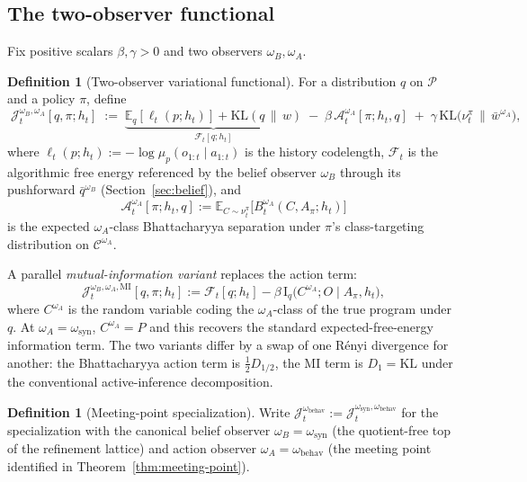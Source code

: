 \documentclass[11pt]{article}
\theoremstyle{definition}
\newtheorem{definition}[theorem]{Definition}
\theoremstyle{remark}
\newcommand{\Ccal}{\mathcal{C}}
\newcommand{\Pcal}{\mathcal{P}}
\newcommand{\E}{\mathbb{E}}
\newcommand{\KL}{\mathrm{KL}}
\newcommand{\I}{\mathrm{I}}
\newcommand{\givena}{\,\|\,}
\newcommand{\ellp}{\ell}
\begin{document}
\subsection{The two-observer functional}
\label{sec:two-observer-functional}

Fix positive scalars $\beta,\gamma>0$ and two observers $\omega_B,\omega_A$.

\begin{definition}[Two-observer variational functional]
\label{def:two-observer-functional}
For a distribution $q$ on $\Pcal$ and a policy $\pi$, define
\[
\boxed{\;
\mathcal J_t^{\omega_B,\omega_A}[q,\pi;h_t]
\;:=\;
\underbrace{\E_q[\ellp_t(p;h_t)]+\KL(q\givena w)}_{\mathcal F_t[q;h_t]}
\;-\;\beta\,\mathcal A_t^{\omega_A}[\pi;h_t,q]
\;+\;\gamma\,\KL\!\bigl(\nu_t^\pi\,\|\,\bar w^{\omega_A}\bigr),
\;}
\]
where $\ellp_t(p;h_t):=-\log\mu_p(o_{1:t}\mid a_{1:t})$ is the history codelength, $\mathcal F_t$ is the algorithmic free energy referenced by the belief observer $\omega_B$ through its pushforward $\bar q^{\omega_B}$ (Section~\ref{sec:belief}), and
\[
\mathcal A_t^{\omega_A}[\pi;h_t,q]:=\E_{C\sim\nu_t^\pi}\bigl[B_t^{\omega_A}(C,A_\pi;h_t)\bigr]
\]
is the expected $\omega_A$-class Bhattacharyya separation under $\pi$'s class-targeting distribution on $\Ccal^{\omega_A}$.
\end{definition}

A parallel \emph{mutual-information variant} replaces the action term:
\[
\mathcal J_t^{\omega_B,\omega_A,\mathrm{MI}}[q,\pi;h_t]
:=\mathcal F_t[q;h_t]-\beta\,\I_q\!\bigl(C^{\omega_A};O\mid A_\pi,h_t\bigr),
\]
where $C^{\omega_A}$ is the random variable coding the $\omega_A$-class of the true program under $q$. At $\omega_A=\omega_{\mathrm{syn}}$, $C^{\omega_A}=P$ and this recovers the standard expected-free-energy information term. The two variants differ by a swap of one R\'enyi divergence for another: the Bhattacharyya action term is $\tfrac{1}{2}D_{1/2}$, the MI term is $D_1=\KL$ under the conventional active-inference decomposition.

\begin{definition}[Meeting-point specialization]
\label{def:meeting-point-shorthand}
Write $\mathcal J_t^{\omega_{\mathrm{behav}}}:=\mathcal J_t^{\omega_{\mathrm{syn}},\omega_{\mathrm{behav}}}$ for the specialization with the canonical belief observer $\omega_B=\omega_{\mathrm{syn}}$ (the quotient-free top of the refinement lattice) and action observer $\omega_A=\omega_{\mathrm{behav}}$ (the meeting point identified in Theorem~\ref{thm:meeting-point}).
\end{definition}
\end{document}
